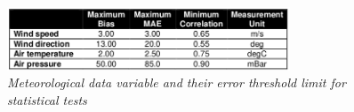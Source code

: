 \begin{figure}[h!]
\includegraphics[width=0.75\textwidth]{figures/EIRGRID_table2.png}
\caption{\textit{Meteorological data variable and their error threshold limit for statistical tests}} 
\label{fig:EIRGRID_table2}
\end{figure}


